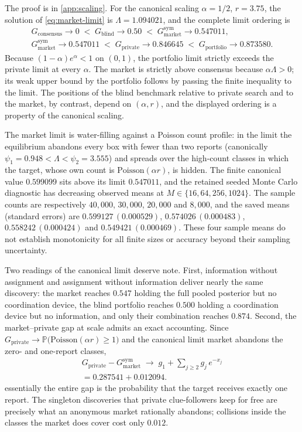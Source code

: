 \documentclass[11pt]{article}
\theoremstyle{definition}
\theoremstyle{remark}
\newcommand{\Prob}{\mathbb{P}}
\newcommand{\1}{\mathbf{1}}
\newcommand{\priv}{\mathrm{private}}
\newcommand{\cons}{\mathrm{consensus}}
\newcommand{\mkt}{\mathrm{market}}
\begin{document}
The proof is in \cref{app:scaling}. For the canonical scaling $\alpha=1/2$, $r=3.75$, the solution of \cref{eq:market-limit} is $\Lambda=1.094021$, and the complete limit ordering is
\[
\begin{gathered}G_{\cons}\to 0
\;<\;G_{\mathrm{blind}}\to 0.50
\;<\;G_{\mkt}^{\mathrm{sym}}\to 0.547011,\\
G_{\mkt}^{\mathrm{sym}}\to 0.547011
\;<\;G_{\priv}\to 0.846645
\;<\;G_{\mathrm{portfolio}}\to 0.873580.\end{gathered}
\]
Because $(1-\alpha)e^{\alpha}<1$ on $(0,1)$, the portfolio limit strictly exceeds the private limit at every $\alpha$. The market is strictly above consensus because $\alpha\Lambda>0$; its weak upper bound by the portfolio follows by passing the finite inequality to the limit. The positions of the blind benchmark relative to private search and to the market, by contrast, depend on $(\alpha,r)$, and the displayed ordering is a property of the canonical scaling.

The market limit is water-filling against a Poisson count profile: in the limit the equilibrium abandons every box with fewer than two reports (canonically $\psi_1=0.948<\Lambda<\psi_2=3.555$) and spreads over the high-count classes in which the target, whose own count is $\mathrm{Poisson}(\alpha r)$, is hidden. The finite canonical value $0.599099$ sits above its limit $0.547011$, and the retained seeded Monte Carlo diagnostic has decreasing observed means at $M\in\{16,64,256,1024\}$. The sample counts are respectively $40{,}000$, $30{,}000$, $20{,}000$ and $8{,}000$, and the saved means (standard errors) are $0.599127\,(0.000529)$, $0.574026\,(0.000483)$, $0.558242\,(0.000424)$ and $0.549421\,(0.000469)$. These four sample means do not establish monotonicity for all finite sizes or accuracy beyond their sampling uncertainty.

Two readings of the canonical limit deserve note. First, information without assignment and assignment without information deliver nearly the same discovery: the market reaches $0.547$ holding the full pooled posterior but no coordination device, the blind portfolio reaches $0.500$ holding a coordination device but no information, and only their combination reaches $0.874$. Second, the market--private gap at scale admits an exact accounting. Since $G_{\priv}\to\Prob\bigl(\mathrm{Poisson}(\alpha r)\ge1\bigr)$ and the canonical limit market abandons the zero- and one-report classes,
\[
\begin{gathered}G_{\priv}-G_{\mkt}^{\mathrm{sym}}\;\longrightarrow\;g_1+\sum_{j\ge2}g_j\,e^{-x_j}\\=0.287541+0.012094.\end{gathered}
\]
essentially the entire gap is the probability that the target receives exactly one report. The singleton discoveries that private clue-followers keep for free are precisely what an anonymous market rationally abandons; collisions inside the classes the market does cover cost only $0.012$.
\end{document}

